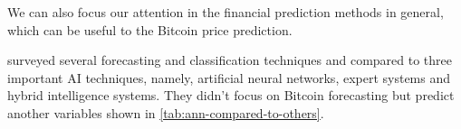 
We can also focus our attention in the financial prediction methods in
general, which can be useful to the Bitcoin price prediction.

\cite{bahrammirzaee2010comparative} surveyed several forecasting and
classification techniques and compared to three important AI
techniques, namely, artificial neural networks, expert systems and
hybrid intelligence systems. They didn't focus on Bitcoin forecasting
but predict another variables shown in
\autoref{tab:ann-compared-to-others}.

